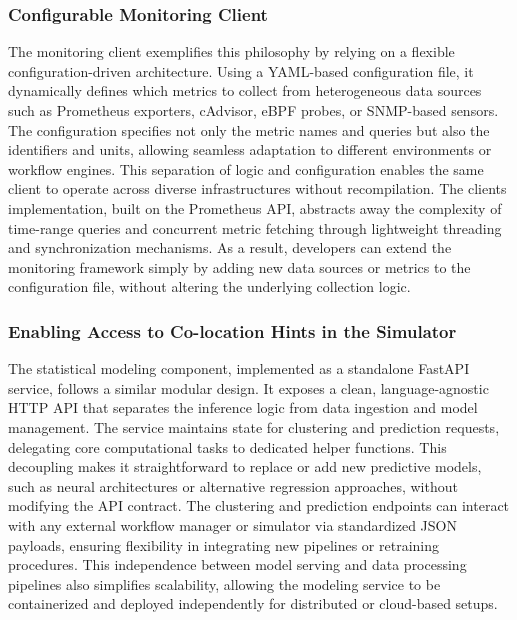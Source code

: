 \subsubsection{Configurable Monitoring Client}
\label{sec:monitoring_client}
The monitoring client exemplifies this philosophy by relying on a flexible configuration-driven architecture. Using a YAML-based configuration file, it dynamically defines which metrics to collect from heterogeneous data sources such as Prometheus exporters, cAdvisor, eBPF probes, or SNMP-based sensors. The configuration specifies not only the metric names and queries but also the identifiers and units, allowing seamless adaptation to different environments or workflow engines. This separation of logic and configuration enables the same client to operate across diverse infrastructures without recompilation. The clients implementation, built on the Prometheus API, abstracts away the complexity of time-range queries and concurrent metric fetching through lightweight threading and synchronization mechanisms. As a result, developers can extend the monitoring framework simply by adding new data sources or metrics to the configuration file, without altering the underlying collection logic.




\subsubsection{Enabling Access to Co-location Hints in the Simulator}
\label{sec:statistical_modeling}
The statistical modeling component, implemented as a standalone FastAPI service, follows a similar modular design. It exposes a clean, language-agnostic HTTP API that separates the inference logic from data ingestion and model management. The service maintains state for clustering and prediction requests, delegating core computational tasks to dedicated helper functions. This decoupling makes it straightforward to replace or add new predictive models, such as neural architectures or alternative regression approaches, without modifying the API contract. The clustering and prediction endpoints can interact with any external workflow manager or simulator via standardized JSON payloads, ensuring flexibility in integrating new pipelines or retraining procedures. This independence between model serving and data processing pipelines also simplifies scalability, allowing the modeling service to be containerized and deployed independently for distributed or cloud-based setups.

